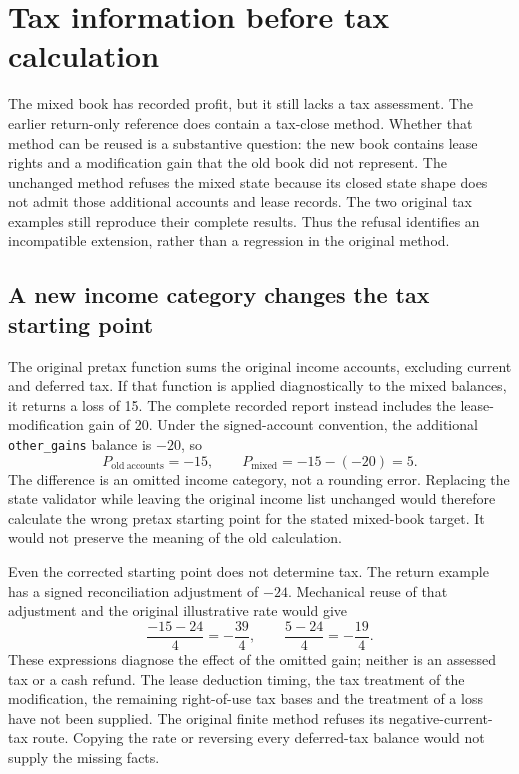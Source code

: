 \section{Tax information before tax calculation}
\label{sec:shared-tax-information}

The mixed book has recorded profit, but it still lacks a tax assessment.
The earlier return-only reference does contain a tax-close method. Whether
that method can be reused is a substantive question: the new book contains
lease rights and a modification gain that the old book did not represent.
The unchanged method refuses the mixed state because its closed state shape
does not admit those additional accounts and lease records. The two original
tax examples still reproduce their complete results. Thus the refusal identifies
an incompatible extension, rather than a regression in the original method.

\subsection{A new income category changes the tax starting point}

The original pretax function sums the original income accounts, excluding
current and deferred tax. If that function is applied diagnostically to the
mixed balances, it returns a loss of 15. The complete recorded report instead
includes the lease-modification gain of 20. Under the signed-account convention,
the additional \texttt{other\_gains} balance is $-20$, so
\[
  P_{\mathrm{old\ accounts}}=-15,
  \qquad
  P_{\mathrm{mixed}}=-15-(-20)=5.
\]
The difference is an omitted income category, not a rounding error. Replacing
the state validator while leaving the original income list unchanged would
therefore calculate the wrong pretax starting point for the stated mixed-book
target. It would not preserve the meaning of the old calculation.

Even the corrected starting point does not determine tax. The return example
has a signed reconciliation adjustment of $-24$. Mechanical reuse of that
adjustment and the original illustrative rate would give
\[
  \frac{-15-24}{4}=-\frac{39}{4},
  \qquad
  \frac{5-24}{4}=-\frac{19}{4}.
\]
These expressions diagnose the effect of the omitted gain; neither is an
assessed tax or a cash refund. The lease deduction timing, the tax treatment
of the modification, the remaining right-of-use tax bases and the treatment
of a loss have not been supplied. The original finite method refuses its
negative-current-tax route. Copying the rate or reversing every deferred-tax
balance would not supply the missing facts.

